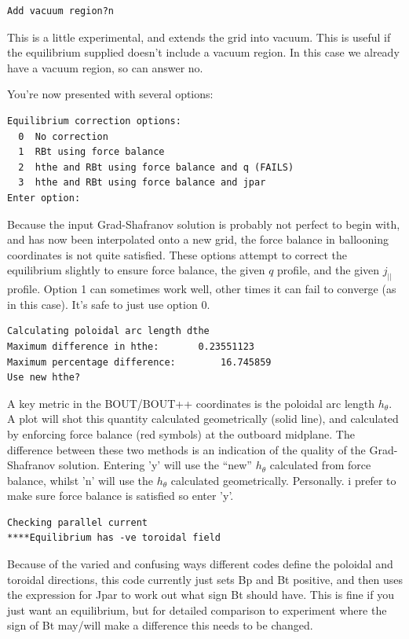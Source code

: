 \documentclass[12pt]{article}
\begin{document}
\begin{verbatim}
Add vacuum region?n
\end{verbatim}
This is a little experimental, and extends the grid into vacuum. This is useful if the equilibrium supplied doesn't include a vacuum region. In this case we already have a vacuum region, so can answer no.

You're now presented with several options:
\begin{verbatim}
Equilibrium correction options:
  0  No correction
  1  RBt using force balance
  2  hthe and RBt using force balance and q (FAILS)
  3  hthe and RBt using force balance and jpar
Enter option:
\end{verbatim}
Because the input Grad-Shafranov solution is probably not perfect to begin with,
and has now been interpolated onto a new grid, the force balance in ballooning
coordinates is not quite satisfied. These options attempt to correct the
equilibrium slightly to ensure force balance, the given $q$ profile, and the
given $j_{||}$ profile. Option 1 can sometimes work well, other times it can
fail to converge (as in this case). It's safe to just use option 0.

\begin{verbatim}
Calculating poloidal arc length dthe
Maximum difference in hthe:       0.23551123
Maximum percentage difference:        16.745859
Use new hthe?
\end{verbatim}
A key metric in the BOUT/BOUT++ coordinates is the poloidal arc length $h_\theta$. A plot will shot this quantity calculated geometrically (solid line), and calculated by enforcing force balance (red symbols) at the outboard midplane.
The difference between these two methods is an indication of the quality of the
Grad-Shafranov solution. Entering 'y' will use the ``new'' $h_\theta$ calculated
from force balance, whilst 'n' will use the $h_\theta$ calculated geometrically.
Personally. i prefer to make sure force balance is satisfied so enter 'y'.

\begin{verbatim}
Checking parallel current
****Equilibrium has -ve toroidal field
\end{verbatim}
Because of the varied and confusing ways different codes define the poloidal
and toroidal directions, this code currently just sets Bp and Bt positive,
and then uses the expression for Jpar to work out what sign Bt should have.
This is fine if you just want an equilibrium, but for detailed comparison to
experiment where the sign of Bt may/will make a difference this needs to be
changed.
\end{document}
